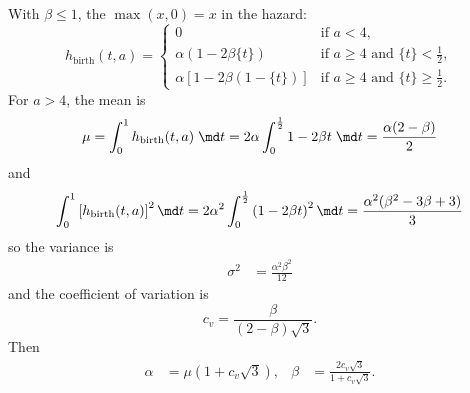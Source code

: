 \documentclass{jpmarticle}
\begin{document}
With $\beta \leq 1$, the $\max(x, 0) = x$ in the hazard:
\begin{equation}
  h_{\text{birth}} (t, a) =
  \begin{cases}
    0 & \text{if $a < 4$},
    \\
    \alpha \left(1 - 2 \beta \{t\}\right)
    & \text{if $a \geq 4$ and $\{t\} < \frac{1}{2}$},
    \\
    \alpha \left[1 - 2 \beta (1 - \{t\})\right]
    & \text{if $a \geq 4$ and $\{t\} \geq \frac{1}{2}$}.
  \end{cases}
\end{equation}
For $a > 4$, the mean is
\begin{align}
  \mu = \int_0^1 h_{\text{birth}}(t, a) \; \md t
  = 2 \alpha \int_0^{\frac{1}{2}} 1 - 2 \beta t \; \md t
  = \frac{\alpha (2 - \beta)}{2}
\end{align}
and
\begin{align}
  \int_0^1 \left[h_{\text{birth}}(t, a)\right]^2 \md t
  = 2 \alpha^2 \int_0^{\frac{1}{2}} \left(1 - 2 \beta t\right)^2 \md t
  = \frac{\alpha^2 (\beta^2 - 3 \beta + 3)}{3}
\end{align}
so the variance is
\begin{align}
  \sigma^2
  &= \frac{\alpha^2 \beta^2}{12}
\end{align}
and the coefficient of variation is
\begin{equation}
  c_v = \frac{\beta}{(2 - \beta) \sqrt{3}}.
\end{equation}
Then
\begin{align}
  \alpha &= \mu \left(1 + c_v \sqrt{3}\right),
  &
  \beta &= \frac{2 c_v \sqrt{3}}{1 + c_v \sqrt{3}}.
\end{align}
\end{document}
